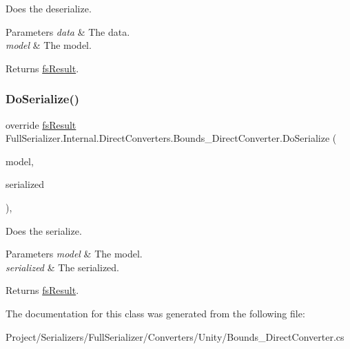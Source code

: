 Does the deserialize. 


\begin{DoxyParams}{Parameters}
{\em data} & The data.\\
\hline
{\em model} & The model.\\
\hline
\end{DoxyParams}
\begin{DoxyReturn}{Returns}
\hyperlink{struct_full_serializer_1_1fs_result}{fs\+Result}.
\end{DoxyReturn}
\mbox{\label{class_full_serializer_1_1_internal_1_1_direct_converters_1_1_bounds___direct_converter_acdba107944e59d9620b06e224c51baf0}} 
\subsubsection{\texorpdfstring{Do\+Serialize()}{DoSerialize()}}
{\footnotesize\ttfamily override \hyperlink{struct_full_serializer_1_1fs_result}{fs\+Result} Full\+Serializer.\+Internal.\+Direct\+Converters.\+Bounds\+\_\+\+Direct\+Converter.\+Do\+Serialize (\begin{DoxyParamCaption}\item[{Bounds}]{model,  }\item[{Dictionary$<$ string, \hyperlink{class_full_serializer_1_1fs_data}{fs\+Data} $>$}]{serialized }\end{DoxyParamCaption})\hspace{0.3cm}{\ttfamily [inline]}, {\ttfamily [protected]}}



Does the serialize. 


\begin{DoxyParams}{Parameters}
{\em model} & The model.\\
\hline
{\em serialized} & The serialized.\\
\hline
\end{DoxyParams}
\begin{DoxyReturn}{Returns}
\hyperlink{struct_full_serializer_1_1fs_result}{fs\+Result}.
\end{DoxyReturn}


The documentation for this class was generated from the following file\+:\begin{DoxyCompactItemize}
\item 
Project/\+Serializers/\+Full\+Serializer/\+Converters/\+Unity/Bounds\+\_\+\+Direct\+Converter.\+cs\end{DoxyCompactItemize}
